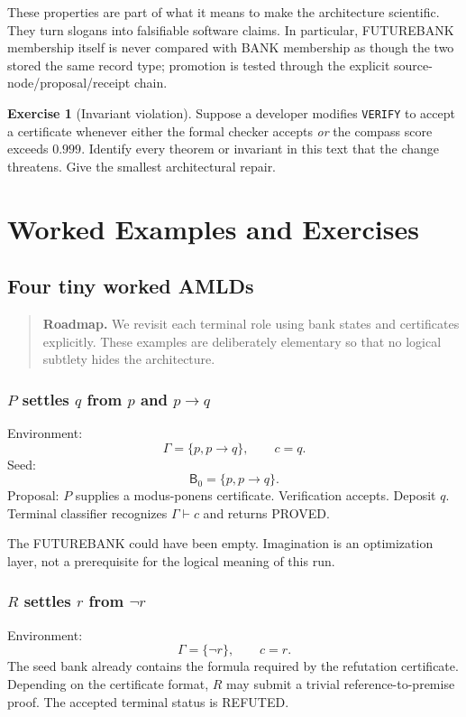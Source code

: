 \documentclass[11pt,openany]{book}
\theoremstyle{definition}
\newtheorem{exercise}[theorem]{Exercise}
\theoremstyle{remark}
\newenvironment{roadmap}{\begin{quote}\small\color{deepblue}\textbf{Roadmap.} }{\end{quote}}
\newcommand{\Bank}{\mathsf{B}}
\begin{document}
These properties are part of what it means to make the architecture scientific. They turn slogans into falsifiable software claims. In particular, FUTUREBANK membership itself is never compared with BANK membership as though the two stored the same record type; promotion is tested through the explicit source-node/proposal/receipt chain.

\begin{exercise}[Invariant violation]\label{ex:invariant}
Suppose a developer modifies \texttt{VERIFY} to accept a certificate whenever either the formal checker accepts \emph{or} the compass score exceeds $0.999$. Identify every theorem or invariant in this text that the change threatens. Give the smallest architectural repair.
\end{exercise}

\part{Worked Examples and Exercises}

\chapter{Four tiny worked AMLDs}
\begin{roadmap}
We revisit each terminal role using bank states and certificates explicitly. These examples are deliberately elementary so that no logical subtlety hides the architecture.
\end{roadmap}

\section{\texorpdfstring{$P$ settles $q$ from $p$ and $p\to q$}{P settles q from p and p to q}}
Environment:
\[
\Gamma=\{p,p\to q\},\qquad c=q.
\]
Seed:
\[
\Bank_0=\{p,p\to q\}.
\]
Proposal: $P$ supplies a modus-ponens certificate. Verification accepts. Deposit $q$. Terminal classifier recognizes $\Gamma\vdash c$ and returns \textsf{PROVED}.

The FUTUREBANK could have been empty. Imagination is an optimization layer, not a prerequisite for the logical meaning of this run.

\section{\texorpdfstring{$R$ settles $r$ from $\neg r$}{R settles r from not-r}}
Environment:
\[
\Gamma=\{\neg r\},\qquad c=r.
\]
The seed bank already contains the formula required by the refutation certificate. Depending on the certificate format, $R$ may submit a trivial reference-to-premise proof. The accepted terminal status is \textsf{REFUTED}.
\end{document}

